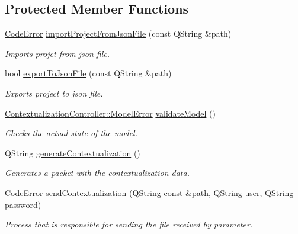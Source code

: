 \subsection*{Protected Member Functions}
\begin{DoxyCompactItemize}
\item 
\mbox{\hyperlink{classContextualizationController_acb38587f7f9e610a5950956b345d69fd}{Code\+Error}} \mbox{\hyperlink{classContextualizationController_ae2b31282f2258673757c77592f7ded00}{import\+Project\+From\+Json\+File}} (const Q\+String \&path)
\begin{DoxyCompactList}\small\item\em Imports projet from json file. \end{DoxyCompactList}\item 
bool \mbox{\hyperlink{classContextualizationController_a26fc3969db0e2217dc6994f819c78572}{export\+To\+Json\+File}} (const Q\+String \&path)
\begin{DoxyCompactList}\small\item\em Exports project to json file. \end{DoxyCompactList}\item 
\mbox{\hyperlink{classContextualizationController_a78e15dc8f6f1e0cb4df6d86b921be8a4}{Contextualization\+Controller\+::\+Model\+Error}} \mbox{\hyperlink{classContextualizationController_a6b806979e0b4e5a3ce3af09230f66fef}{validate\+Model}} ()
\begin{DoxyCompactList}\small\item\em Checks the actual state of the model. \end{DoxyCompactList}\item 
Q\+String \mbox{\hyperlink{classContextualizationController_a737d2562702b3b0da946e7b2f9fa336d}{generate\+Contextualization}} ()
\begin{DoxyCompactList}\small\item\em Generates a packet with the contextualization data. \end{DoxyCompactList}\item 
\mbox{\hyperlink{classContextualizationController_acb38587f7f9e610a5950956b345d69fd}{Code\+Error}} \mbox{\hyperlink{classContextualizationController_a46ec193d423be47137f34d746145801f}{send\+Contextualization}} (Q\+String const \&path, Q\+String user, Q\+String password)
\begin{DoxyCompactList}\small\item\em Process that is responsible for sending the file received by parameter. \end{DoxyCompactList}\item 

\end{DoxyCompactItemize}
